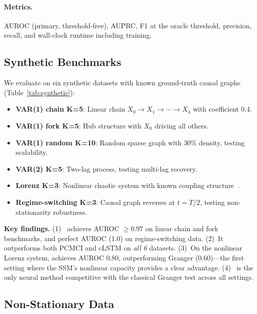 \paragraph{Metrics.}
AUROC (primary, threshold-free), AUPRC, F1 at the oracle threshold,
precision, recall, and wall-clock runtime including training.

\subsection{Synthetic Benchmarks}
\label{sec:synthetic}

We evaluate on six synthetic datasets with known ground-truth causal
graphs (Table~\ref{tab:synthetic}):

\begin{itemize}[leftmargin=1.5em, topsep=0pt, itemsep=0pt]
    \item \textbf{VAR(1) chain K=5}: Linear chain
    $X_0 \to X_1 \to \cdots \to X_4$ with coefficient 0.4.
    \item \textbf{VAR(1) fork K=5}: Hub structure with $X_0$ driving
    all others.
    \item \textbf{VAR(1) random K=10}: Random sparse graph with 30\%
    density, testing scalability.
    \item \textbf{VAR(2) K=5}: Two-lag process, testing multi-lag
    recovery.
    \item \textbf{Lorenz K=3}: Nonlinear chaotic system with known
    coupling structure~\citep{lorenz1963deterministic}.
    \item \textbf{Regime-switching K=3}: Causal graph reverses at
    $t = T/2$, testing non-stationarity robustness.
\end{itemize}



\textbf{Key findings.} (1)~\methodname{} achieves AUROC $\geq 0.97$
on linear chain and fork benchmarks, and perfect AUROC (1.0) on
regime-switching data. (2)~It outperforms both PCMCI and cLSTM on
\emph{all 6} datasets. (3)~On the nonlinear Lorenz system,
\methodname{} achieves AUROC 0.80, outperforming Granger (0.60)---the
first setting where the SSM's nonlinear capacity provides a clear
advantage. (4)~\methodname{} is the only neural method competitive
with the classical Granger test across all settings.

\subsection{Non-Stationary Data}
\label{sec:nonstationary}

